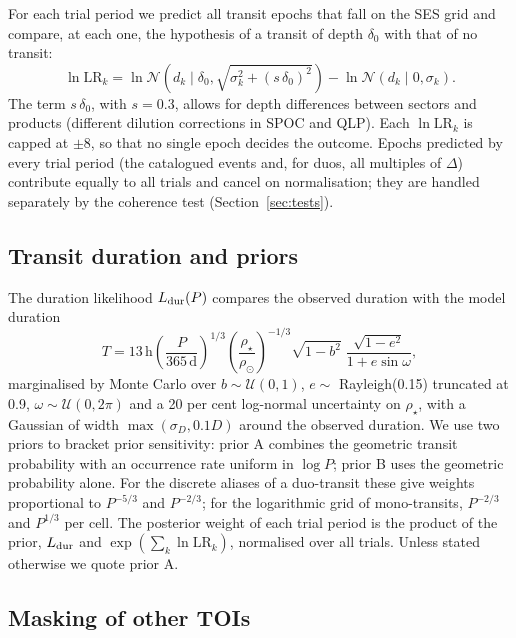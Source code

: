 \documentclass[fleqn,usenatbib]{mnras}
\begin{document}
For each trial period we predict all transit epochs that fall on the SES grid and compare, at each one, the hypothesis of a transit of depth $\delta_0$ with that of no transit:
\begin{equation}
\ln \mathrm{LR}_k = \ln \mathcal{N}\!\left(d_k \mid \delta_0, \sqrt{\sigma_k^2 + (s\,\delta_0)^2}\right) - \ln \mathcal{N}\!\left(d_k \mid 0, \sigma_k\right).
\end{equation}
The term $s\,\delta_0$, with $s = 0.3$, allows for depth differences between sectors and products (different dilution corrections in SPOC and QLP). Each $\ln\mathrm{LR}_k$ is capped at $\pm8$, so that no single epoch decides the outcome. Epochs predicted by every trial period (the catalogued events and, for duos, all multiples of $\Delta$) contribute equally to all trials and cancel on normalisation; they are handled separately by the coherence test (Section~\ref{sec:tests}).

\subsection{Transit duration and priors}

The duration likelihood $L_{\rm dur}(P)$ compares the observed duration with the model duration
\begin{equation}
T = 13\,\mathrm{h}\left(\frac{P}{365\,\mathrm{d}}\right)^{1/3}\left(\frac{\rho_\star}{\rho_\odot}\right)^{-1/3}\sqrt{1-b^2}\;\frac{\sqrt{1-e^2}}{1+e\sin\omega},
\end{equation}
marginalised by Monte Carlo over $b \sim \mathcal{U}(0, 1)$, $e \sim$ Rayleigh(0.15) truncated at 0.9, $\omega \sim \mathcal{U}(0, 2\pi)$ and a 20 per cent log-normal uncertainty on $\rho_\star$, with a Gaussian of width $\max(\sigma_D, 0.1D)$ around the observed duration. We use two priors to bracket prior sensitivity: prior A combines the geometric transit probability with an occurrence rate uniform in $\log P$; prior B uses the geometric probability alone. For the discrete aliases of a duo-transit these give weights proportional to $P^{-5/3}$ and $P^{-2/3}$; for the logarithmic grid of mono-transits, $P^{-2/3}$ and $P^{1/3}$ per cell. The posterior weight of each trial period is the product of the prior, $L_{\rm dur}$ and $\exp(\sum_k \ln \mathrm{LR}_k)$, normalised over all trials. Unless stated otherwise we quote prior A.

\subsection{Masking of other TOIs}
\label{sec:masking}
\end{document}
